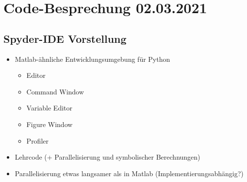 \documentclass{scrarticle}
\begin{document}
\section*{Code-Besprechung 02.03.2021}
\subsection*{Spyder-IDE Vorstellung}
\begin{itemize}
\item Matlab-\"ahnliche Entwicklungsumgebung f\"ur Python
  \begin{itemize}
  \item Editor
  \item Command Window
  \item Variable Editor
  \item Figure Window
  \item Profiler
    \end{itemize}
\item Lehrcode (+ Parallelisierung und symbolischer Berechnungen)
\item Parallelisierung etwas langsamer als in Matlab (Implementierungsabh\"angig?)
\end{itemize}
\end{document}
